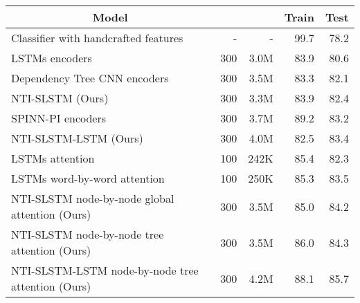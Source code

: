 \documentclass[11pt]{article}
\begin{document}
\begin{table*}[t]
\begin{center}
\small
\begin{tabular}{c|c|c|c|c}
\hline 
Model &  &  & Train	& Test \\
\hline
\multicolumn{1}{l|}{Classifier with handcrafted features \cite{bowman:15}} & \multicolumn{1}{|r|}{-} & \multicolumn{1}{|r|}{-} & \multicolumn{1}{|r|}{99.7} & \multicolumn{1}{|r}{78.2} \\
\hline
\multicolumn{1}{l|}{LSTMs encoders \cite{bowman:15}} & \multicolumn{1}{|r|}{300} & \multicolumn{1}{|r|}{3.0M} & \multicolumn{1}{|r|}{83.9} & \multicolumn{1}{|r}{80.6} \\
\multicolumn{1}{l|}{Dependency Tree CNN encoders \cite{Lili16}} & \multicolumn{1}{|r|}{300} & \multicolumn{1}{|r|}{3.5M} & \multicolumn{1}{|r|}{83.3} & \multicolumn{1}{|r}{82.1} \\
\multicolumn{1}{l|}{NTI-SLSTM (Ours)} & \multicolumn{1}{|r|}{300} & \multicolumn{1}{|r|}{3.3M} & \multicolumn{1}{|r|}{83.9} & \multicolumn{1}{|r}{82.4} \\
\multicolumn{1}{l|}{SPINN-PI encoders \cite{BowmanGRGMP16}} & \multicolumn{1}{|r|}{300} & \multicolumn{1}{|r|}{3.7M} & \multicolumn{1}{|r|}{89.2} & \multicolumn{1}{|r}{83.2} \\
\multicolumn{1}{l|}{NTI-SLSTM-LSTM (Ours)} & \multicolumn{1}{|r|}{300} & \multicolumn{1}{|r|}{4.0M} & \multicolumn{1}{|r|}{82.5} & \multicolumn{1}{|r}{83.4} \\ 
\hline
\multicolumn{1}{l|}{LSTMs attention \cite{rocktaschel:16}} & \multicolumn{1}{|r|}{100} & \multicolumn{1}{|r|}{242K} & \multicolumn{1}{|r|}{85.4} & \multicolumn{1}{|r}{82.3} \\
\multicolumn{1}{l|}{LSTMs word-by-word attention \cite{rocktaschel:16}} & \multicolumn{1}{|r|}{100} & \multicolumn{1}{|r|}{250K} & \multicolumn{1}{|r|}{85.3} & \multicolumn{1}{|r}{83.5} \\
\multicolumn{1}{l|}{NTI-SLSTM node-by-node global attention (Ours)} & \multicolumn{1}{|r|}{300} & \multicolumn{1}{|r|}{3.5M} & \multicolumn{1}{|r|}{85.0} & \multicolumn{1}{|r}{84.2} \\
\multicolumn{1}{l|}{NTI-SLSTM node-by-node tree attention (Ours)} & \multicolumn{1}{|r|}{300} & \multicolumn{1}{|r|}{3.5M} & \multicolumn{1}{|r|}{86.0} & \multicolumn{1}{|r}{84.3} \\
\multicolumn{1}{l|}{NTI-SLSTM-LSTM node-by-node tree attention (Ours)} & \multicolumn{1}{|r|}{300} & \multicolumn{1}{|r|}{4.2M} & \multicolumn{1}{|r|}{88.1} & \multicolumn{1}{|r}{85.7} \\

\end{tabular}
\end{center}
\end{table*}
\end{document}
